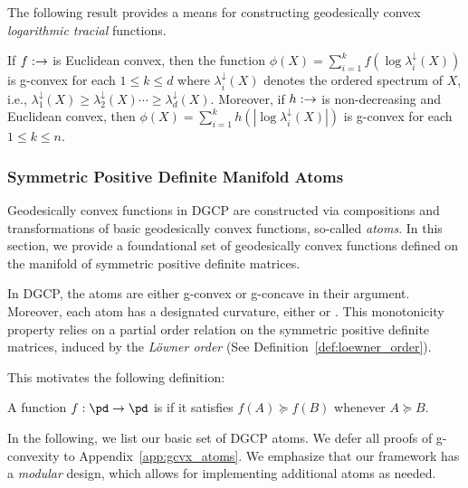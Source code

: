 \documentclass[twoside,11pt]{article}
\newcommand{\mw}[1]{\textcolor{blue}{\emph{MW: #1}}}
\begin{document}
The following result provides a means for constructing geodesically convex  \textit{logarithmic tracial} functions.

\begin{theorem}\label{theorem:sra_logtrace}
    If $f: \real \to \real$ is Euclidean convex, then the function $\phi(X) = \sum_{i=1}^k f \left(\log \lambda^\downarrow_i(X)\right)$ is g-convex for each $1 \leq k \leq d$ where $\lambda_i^\downarrow(X)$ denotes the ordered spectrum of $X$, i.e., $\lambda_1^\downarrow(X) \geq \lambda_2^\downarrow(X) \cdots \geq \lambda_d^\downarrow(X)$. Moreover, if $h: \real \to \real$ is non-decreasing and Euclidean convex, then $\phi(X) = \sum_{i=1}^k h(|\log \lambda_i^\downarrow(X)|)$ is g-convex for each $1 \leq k \leq n$.
\end{theorem}





\subsubsection{Symmetric Positive Definite Manifold Atoms}\label{sec:atoms}
Geodesically convex functions in DGCP are constructed via compositions and transformations of basic geodesically convex functions, so-called \textit{atoms}. In this section, we provide a foundational set of geodesically convex functions defined on the manifold of symmetric positive definite matrices. 



In DGCP, the atoms are either g-convex or g-concave in their argument. Moreover, each atom has a designated curvature, either  or . This monotonicity property relies on a partial order relation on the symmetric positive definite matrices, induced by the \emph{Löwner order} (See Definition~\ref{def:loewner_order}).

This motivates the following definition:
\begin{definition}
    A function $f:\pd \to \pd$ 
    is  if it satisfies 
    $f(A) \succeq f(B)$
    whenever $A \succeq B$. 
\end{definition}
%
In the following, we list our basic set of DGCP atoms. We defer all proofs of g-convexity to Appendix~\ref{app:gcvx_atoms}. We emphasize that our framework has a \emph{modular} design, which allows for implementing additional atoms as needed. 
\end{document}

